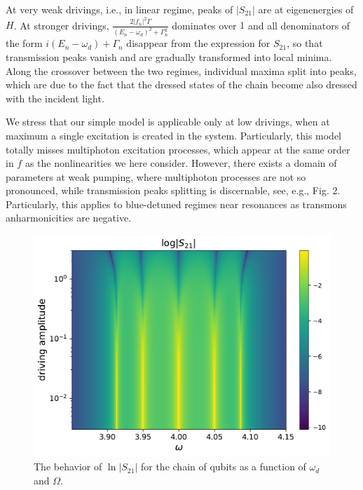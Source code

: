 \documentclass[%
 aps, pra,
 amsmath,amssymb,
 preprint,%
superscriptaddress
]{revtex4-2}
\begin{document}
At very weak drivings, i.e., in linear regime, peaks of $|S_{21}|$ are at eigenenergies of $H$. At stronger drivings,
$ \frac{2 |f_{n}|^2 \Gamma}{\left(E_n - \omega_d\right)^2 +
	\Gamma_n^2}$ dominates over $1$ and
all denominators of the form $i\left(E_n - \omega_d\right) + \Gamma_n$
disappear from the expression for $S_{21}$, so that
transmission peaks vanish and are gradually transformed into local minima. Along the crossover between the two regimes,
individual maxima split into peaks, which are due to the fact that the dressed states of the chain become also dressed with the incident light. 

We stress that our simple model is applicable only at low drivings, when at maximum a single excitation is created in the system. Particularly, this model totally misses multiphoton excitation processes, which appear at the same order in $f$ as the nonlinearities we here consider. However, there exists a domain of parameters at weak pumping, where multiphoton processes are not so pronounced, while transmission peaks splitting is discernable, see, e.g., Fig. 2. Particularly, this applies to blue-detuned regimes near resonances as transmons anharmonicities are negative.

\begin{figure}[h!]
\includegraphics[width=.5\linewidth]{map-s21-5qb2-w-log.pdf}
	\caption{The behavior of $\ln |S_{21}|$ for the chain of qubits as
		a function of $\omega_d$ and $\Omega$.}
	\label{fig:qubitchain}
\end{figure}

	
\end{document}
